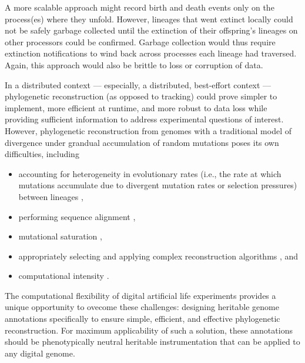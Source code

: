 A more scalable approach might record birth and death events only on the process(es) where they unfold.
However, lineages that went extinct locally could not be safely garbage collected until the extinction of their offspring's lineages on other processors could be confirmed.
Garbage collection would thus require extinction notifications to wind back across processes each lineage had traversed.
Again, this approach would also be brittle to loss or corruption of data.


In a distributed context --- especially, a distributed, best-effort context --- phylogenetic reconstruction (as opposed to tracking) could prove simpler to implement, more efficient at runtime, and more robust to data loss while providing sufficient information to address experimental questions of interest.
However, phylogenetic reconstruction from genomes with a traditional model of divergence under grandual accumulation of random mutations poses its own difficulties, including
\begin{itemize}
\item accounting for heterogeneity in evolutionary rates (i.e., the rate at which mutations accumulate due to divergent mutation rates or selection pressures) between lineages \citep{lack2010identifying},
\item performing sequence alignment \citep{casci2008lining},
\item mutational saturation \citep{hagstrom2004using},
\item appropriately selecting and applying complex reconstruction algorithms \citep{kapli2020phylogenetic}, and
\item computational intensity \citep{sarkar2010hardware}.
\end{itemize}

The computational flexibility of digital artificial life experiments provides a unique opportunity to ovecome these challenges: designing heritable genome annotations specifically to ensure simple, efficient, and effective phylogenetic reconstruction.
For maximum applicability of such a solution, these annotations should be phenotypically neutral heritable instrumentation \citep{stanley2002evolving} that can be applied to any digital genome.

